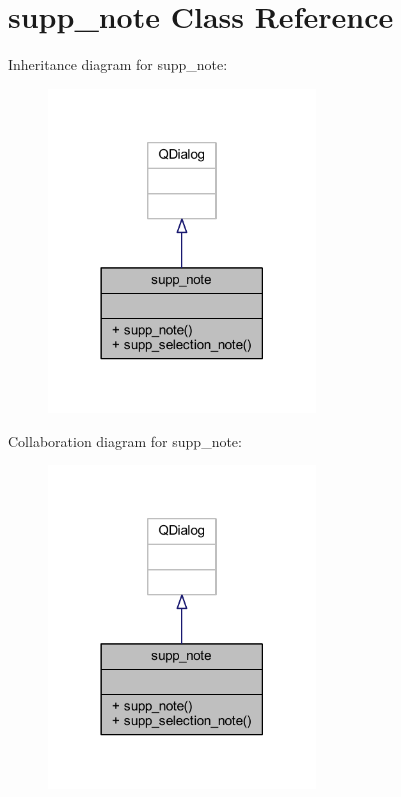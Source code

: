 \hypertarget{classsupp__note}{}\section{supp\+\_\+note Class Reference}
\label{classsupp__note}


Inheritance diagram for supp\+\_\+note\+:
\nopagebreak
\begin{figure}[H]
\begin{center}
\leavevmode
\includegraphics[width=201pt]{classsupp__note__inherit__graph}
\end{center}
\end{figure}


Collaboration diagram for supp\+\_\+note\+:
\nopagebreak
\begin{figure}[H]
\begin{center}
\leavevmode
\includegraphics[width=201pt]{classsupp__note__coll__graph}
\end{center}
\end{figure}
